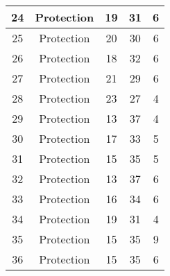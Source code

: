 \documentclass[results.tex]{subfiles}
\begin{document}
\begin{center}
\begin{tabular}{| c || c | c | c | c |}
            \hline
            24                      & Protection                   & 19                     & 31                      & 6                    \\
            \hline
            25                      & Protection                   & 20                     & 30                      & 6                    \\
            \hline
            26                      & Protection                   & 18                     & 32                      & 6                    \\
            \hline
            27                      & Protection                   & 21                     & 29                      & 6                    \\
            \hline
            28                      & Protection                   & 23                     & 27                      & 4                    \\
            \hline
            29                      & Protection                   & 13                     & 37                      & 4                    \\
            \hline
            30                      & Protection                   & 17                     & 33                      & 5                    \\
            \hline
            31                      & Protection                   & 15                     & 35                      & 5                    \\
            \hline
            32                      & Protection                   & 13                     & 37                      & 6                    \\
            \hline
            33                      & Protection                   & 16                     & 34                      & 6                    \\
            \hline
            34                      & Protection                   & 19                     & 31                      & 4                    \\
            \hline
            35                      & Protection                   & 15                     & 35                      & 9                    \\
            \hline
            36                      & Protection                   & 15                     & 35                      & 6                    \\

\end{tabular}
\end{center}
\end{document}
